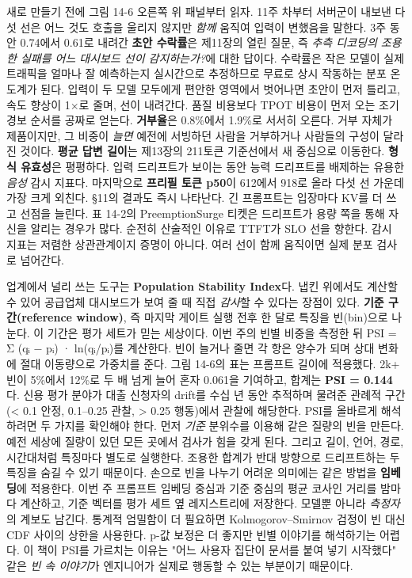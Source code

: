 새로 만들기 전에 그림 14-6 오른쪽 위 패널부터 읽자. 11주 차부터 서버군이 내보낸 다섯 선은 어느 것도 호출을 울리지 않지만 \textit{함께} 움직여 입력이 변했음을 말한다. 3주 동안 0.74에서 0.61로 내려간 \textbf{초안 수락률}은 제11장의 열린 질문, 즉 \textit{추측 디코딩의 조용한 실패를 어느 대시보드 선이 감지하는가?}에 대한 답이다. 수락률은 작은 모델이 실제 트래픽을 얼마나 잘 예측하는지 실시간으로 추정하므로 무료로 상시 작동하는 분포 온도계가 된다. 입력이 두 모델 모두에게 편안한 영역에서 벗어나면 초안이 먼저 틀리고, 속도 향상이 1×로 줄며, 선이 내려간다. 품질 비용보다 TPOT 비용이 먼저 오는 조기 경보 순서를 공짜로 얻는다. \textbf{거부율}은 0.8\%에서 1.9\%로 서서히 오른다. 거부 자체가 제품이지만, 그 비중이 \textit{늘면} 예전에 서빙하던 사람을 거부하거나 사람들의 구성이 달라진 것이다. \textbf{평균 답변 길이}는 제13장의 211토큰 기준선에서 새 중심으로 이동한다. \textbf{형식 유효성}은 평평하다. 입력 드리프트가 보이는 동안 능력 드리프트를 배제하는 유용한 \textit{음성} 감시 지표다. 마지막으로 \textbf{프리필 토큰 p50}이 612에서 918로 올라 다섯 선 가운데 가장 크게 외친다. §11의 결과도 즉시 나타난다. 긴 프롬프트는 입장마다 KV를 더 쓰고 선점을 늘린다. 표 14-2의 PreemptionSurge 티켓은 드리프트가 용량 쪽을 통해 자신을 알리는 경우가 많다. 순전히 산술적인 이유로 TTFT가 SLO 선을 향한다. 감시 지표는 저렴한 상관관계이지 증명이 아니다. 여러 선이 함께 움직이면 실제 분포 검사로 넘어간다.

업계에서 널리 쓰는 도구는 \textbf{Population Stability Index}다. 냅킨 위에서도 계산할 수 있어 공급업체 대시보드가 보여 줄 때 직접 \textit{감사}할 수 있다는 장점이 있다. \textbf{기준 구간(reference window)}, 즉 마지막 게이트 실행 전후 한 달로 특징을 빈(bin)으로 나눈다. 이 기간은 평가 세트가 믿는 세상이다. 이번 주의 빈별 비중을 측정한 뒤 PSI = Σ (qᵢ − pᵢ) · ln(qᵢ/pᵢ)를 계산한다. 빈이 늘거나 줄면 각 항은 양수가 되며 상대 변화에 절대 이동량으로 가중치를 준다. 그림 14-6의 표는 프롬프트 길이에 적용했다. 2k+ 빈이 5\%에서 12\%로 두 배 넘게 늘어 혼자 0.061을 기여하고, 합계는 \textbf{PSI = 0.144}다. 신용 평가 분야가 대출 신청자의 drift를 수십 년 동안 추적하며 물려준 관례적 구간(< 0.1 안정, 0.1–0.25 관찰, > 0.25 행동)에서 관찰에 해당한다. PSI를 올바르게 해석하려면 두 가지를 확인해야 한다. 먼저 \textit{기준} 분위수를 이용해 같은 질량의 빈을 만든다. 예전 세상에 질량이 있던 모든 곳에서 검사가 힘을 갖게 된다. 그리고 길이, 언어, 경로, 시간대처럼 특징마다 별도로 실행한다. 조용한 합계가 반대 방향으로 드리프트하는 두 특징을 숨길 수 있기 때문이다. 손으로 빈을 나누기 어려운 의미에는 같은 방법을 \textbf{임베딩}에 적용한다. 이번 주 프롬프트 임베딩 중심과 기준 중심의 평균 코사인 거리를 밤마다 계산하고, 기준 벡터를 평가 세트 옆 레지스트리에 저장한다. 모델뿐 아니라 \textit{측정자}의 계보도 남긴다. 통계적 엄밀함이 더 필요하면 Kolmogorov–Smirnov 검정이 빈 대신 CDF 사이의 상한을 사용한다. p-값 보정은 더 좋지만 빈별 이야기를 해석하기는 어렵다. 이 책이 PSI를 가르치는 이유는 "어느 사용자 집단이 문서를 붙여 넣기 시작했다" 같은 \textit{빈 속 이야기}가 엔지니어가 실제로 행동할 수 있는 부분이기 때문이다.

